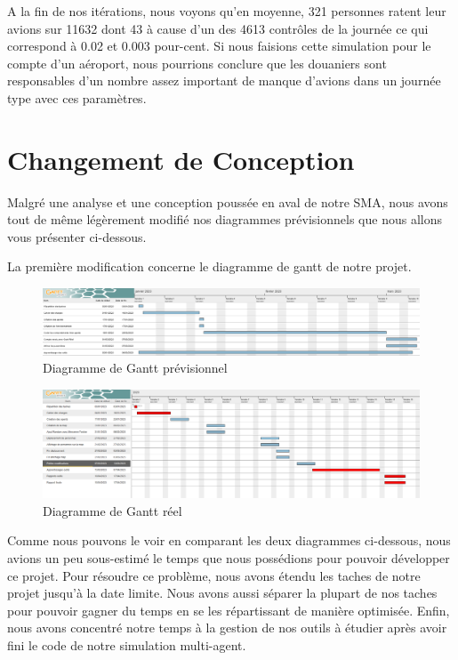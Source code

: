 \documentclass[12pt,french]{article} %
\begin{document}
A la fin de nos itérations, nous voyons qu'en moyenne, 321 personnes ratent leur avions sur 11632 dont 43 à cause d'un des 4613 contrôles de la journée ce qui correspond à 0.02 et 0.003 pour-cent.
Si nous faisions cette simulation pour le compte d'un aéroport, nous pourrions conclure que les douaniers sont responsables d'un nombre assez important de manque d'avions dans un journée type avec ces paramètres.  

\section{Changement de Conception}

Malgré une analyse et une conception poussée en aval de notre SMA, nous avons tout de même légèrement modifié nos diagrammes prévisionnels que nous allons vous présenter ci-dessous.
\newline

La première modification concerne le diagramme de gantt de notre projet.

\begin{figure}[H]
	\centering
	\includegraphics[scale=0.35]{gantt.png}
	\caption{Diagramme de Gantt prévisionnel}    
\end{figure}

\begin{figure}[H]
	\centering
	\includegraphics[scale=0.285]{ganntreel.png}
	\caption{Diagramme de Gantt réel}   
\end{figure}
 
 Comme nous pouvons le voir en comparant les deux diagrammes ci-dessous, nous avions un peu sous-estimé le temps que nous possédions pour pouvoir développer ce projet. Pour résoudre ce problème, nous avons étendu les taches de notre projet jusqu'à la date limite. Nous avons aussi séparer la plupart de nos taches pour pouvoir gagner du temps en se les répartissant de manière optimisée. Enfin, nous avons concentré notre temps à la gestion de nos outils à étudier après avoir fini le code de notre simulation multi-agent.
 
\end{document}
